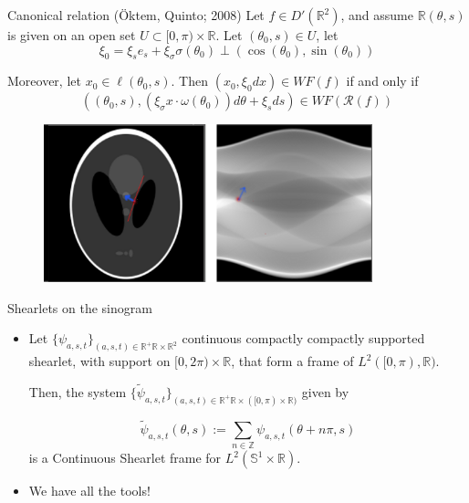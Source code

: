 \begin{frame}
\begin{block}{Canonical relation (\"Oktem, Quinto; 2008)}
Let $f\in D'(\mathbb{R}^2)$, and assume $\mathbb{R}(\theta,s)$ is given on an open set $U\subset [0,\pi)\times\mathbb{R}$. Let $(
\theta_0,s)\in U$, let 
$$\xi_0 = \xi_s e_s+\xi_{\sigma}\sigma(\theta_0) \perp (\cos(\theta_0),\sin(\theta_0))$$

Moreover, let  $x_0\in \ell(\theta_0,s)$. Then $(x_0,\xi_0 dx)\in WF(f)$ if and only if
$$
((\theta_0,s),(\xi_{\sigma}x\cdot\omega(\theta_0))d\theta+\xi_sds)\in WF(\mathcal{R}(f))
$$ 
\end{block}
\pause

\begin{figure}[!tbp]
  \centering
    \includegraphics[width= 0.85\textwidth]{Images/CT_canonical.png}
\end{figure}
\end{frame}

\begin{frame}
\begin{block}{Shearlets on the sinogram}
\begin{itemize}
\item Let $\{\psi_{a,s,t}\}_{(a,s,t)\in\mathbb{R}^+\mathbb{R}\times\mathbb{R}^2}$ continuous compactly compactly supported shearlet, with support on $[0,2\pi)\times\mathbb{R}$, that form a frame of $L^2([0,\pi),\mathbb{R})$. 

\bigskip

Then, the system $\{\tilde{\psi}_{a,s,t}\}_{(a,s,t)\in\mathbb{R}^+\mathbb{R}\times([0,\pi)\times\mathbb{R})}$ given by

$$
\tilde{\psi}_{a,s,t}(\theta,s):=\sum_{n\in \mathbb{Z}}\psi_{a,s,t}(\theta+n\pi,s)
$$
is a Continuous Shearlet frame for $L^2(\mathbb{S}^1\times\mathbb{R})$.

\end{itemize}
\end{block}

\bigskip
\pause

\begin{itemize}
\item We have all the tools!
\end{itemize}
\end{frame}

